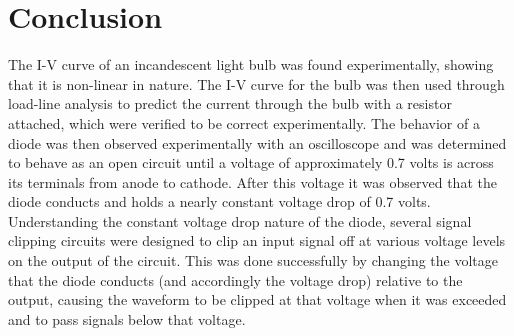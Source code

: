 \documentclass[12pt]{article}
\begin{document}
\section{Conclusion}

The I-V curve of an incandescent light bulb was found experimentally, showing that it is non-linear in nature. The I-V curve for the bulb was then used through load-line analysis to predict the current through the bulb with a resistor attached, which were verified to be correct experimentally. The behavior of a diode was then observed experimentally with an oscilloscope and was determined to behave as an open circuit until a voltage of approximately 0.7 volts is across its terminals from anode to cathode. After this voltage it was observed that the diode conducts and holds a nearly constant voltage drop of 0.7 volts. Understanding the constant voltage drop nature of the diode, several signal clipping circuits were designed to clip an input signal off at various voltage levels on the output of the circuit. This was done successfully by changing the voltage that the diode conducts (and accordingly the voltage drop) relative to the output, causing the waveform to be clipped at that voltage when it was exceeded and to pass signals below that voltage.
\end{document}

